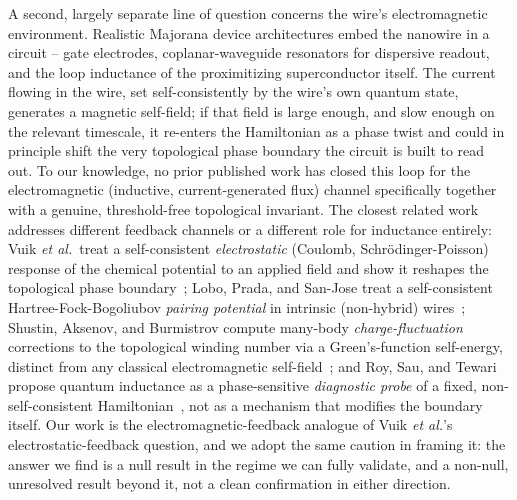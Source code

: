 \documentclass[aps,physrev,reprint,superscriptaddress,amsmath,amssymb,floatfix]{revtex4-2}
\begin{document}
A second, largely separate line of question concerns the wire's
electromagnetic environment. Realistic Majorana device architectures
embed the nanowire in a circuit -- gate electrodes, coplanar-waveguide
resonators for dispersive readout, and the loop inductance of the
proximitizing superconductor itself. The current flowing in the wire, set
self-consistently by the wire's own quantum state, generates a magnetic
self-field; if that field is large enough, and slow enough on the
relevant timescale, it re-enters the Hamiltonian as a phase twist and
could in principle shift the very topological phase boundary the circuit
is built to read out. To our knowledge, no prior published work has
closed this loop for the electromagnetic (inductive, current-generated
flux) channel specifically together with a genuine, threshold-free
topological invariant. The closest related work addresses different
feedback channels or a different role for inductance entirely: Vuik
\emph{et al.}\ treat a self-consistent \emph{electrostatic} (Coulomb,
Schr\"odinger-Poisson) response of the chemical potential to an applied
field and show it reshapes the topological phase
boundary~\cite{vuik2016}; Lobo, Prada, and San-Jose treat a self-consistent
Hartree-Fock-Bogoliubov \emph{pairing potential} in intrinsic (non-hybrid)
wires~\cite{lobo2025}; Shustin, Aksenov, and Burmistrov compute
many-body \emph{charge-fluctuation} corrections to the topological
winding number via a Green's-function self-energy, distinct from any
classical electromagnetic self-field~\cite{shustin2024}; and Roy, Sau,
and Tewari propose quantum inductance as a phase-sensitive
\emph{diagnostic probe} of a fixed, non-self-consistent
Hamiltonian~\cite{roy2026inductance}, not as a mechanism that modifies the
boundary itself. Our work is the electromagnetic-feedback analogue of
Vuik \emph{et al.}'s electrostatic-feedback question, and we adopt the
same caution in framing it: the answer we find is a null result in the
regime we can fully validate, and a non-null, unresolved result beyond
it, not a clean confirmation in either direction.
\end{document}
